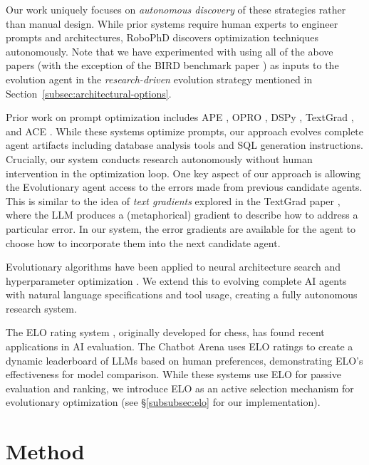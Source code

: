 \documentclass{article}
\begin{document}
Our work uniquely focuses on \textit{autonomous discovery} of these strategies rather than manual design. While prior systems require human experts to engineer prompts and architectures, RoboPhD discovers optimization techniques autonomously.  
Note that we have experimented with using all of the above papers (with the exception of the BIRD benchmark paper \citep{bird2023}) as inputs to the evolution agent in the \textit{research-driven} evolution strategy mentioned in Section~\ref{subsec:architectural-options}.

Prior work on prompt optimization includes APE \citep{ape2022}, OPRO \citep{opro2023}, DSPy \citep{dspy2023}, TextGrad \citep{yuksekgonul2025optimizing}, and ACE \citep{zhang2025agentic}.
While these systems optimize prompts, our approach evolves complete agent artifacts including database analysis tools and SQL generation instructions.
Crucially, our system conducts research autonomously without human intervention in the optimization loop. One key aspect of our approach is allowing the Evolutionary agent access to the errors made from previous candidate agents. This is similar to the idea of \textit{text gradients} explored in the TextGrad paper \citep{yuksekgonul2025optimizing}, where the LLM produces a (metaphorical) gradient to describe how to address a particular error. In our system, the error gradients are available for the agent to choose how to incorporate them into the next candidate agent. 

Evolutionary algorithms have been applied to neural architecture search \citep{nas2019}
and hyperparameter optimization \citep{loshchilov2016cmaes,jaderberg2017pbt}.
We extend this to evolving complete AI agents with natural language specifications and tool usage, creating a fully autonomous research system.

The ELO rating system \citep{elo1978}, originally developed for chess, has found recent applications in AI evaluation.
The Chatbot Arena \citep{zheng2023} uses ELO ratings to create a dynamic leaderboard of LLMs based on human preferences, demonstrating ELO's effectiveness for model comparison.
While these systems use ELO for passive evaluation and ranking, we introduce ELO as an active selection mechanism for evolutionary optimization (see §\ref{subsubsec:elo} for our implementation).

\section{Method}
\end{document}
